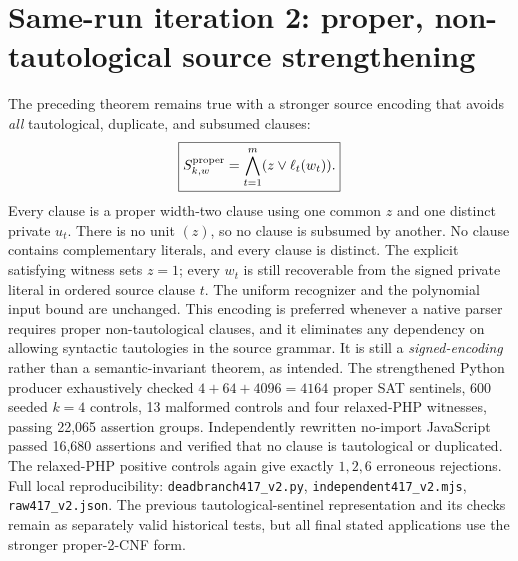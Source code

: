 \documentclass[11pt]{article}
\begin{document}
\section*{Same-run iteration 2: proper, non-tautological source strengthening}
The preceding theorem remains true with a stronger source encoding that avoids \emph{all} tautological, duplicate, and subsumed clauses:
\[
\boxed{S^{\rm proper}_{k,w}=\bigwedge_{t=1}^{m}(z\vee\ell_t(w_t)).}
\]
Every clause is a proper width-two clause using one common \(z\) and one distinct private \(u_t\). There is no unit \((z)\), so no clause is subsumed by another. No clause contains complementary literals, and every clause is distinct. The explicit satisfying witness sets \(z=1\); every \(w_t\) is still recoverable from the signed private literal in ordered source clause \(t\). The uniform recognizer and the polynomial input bound are unchanged. This encoding is preferred whenever a native parser requires proper non-tautological clauses, and it eliminates any dependency on allowing syntactic tautologies in the source grammar. It is still a \emph{signed-encoding} rather than a semantic-invariant theorem, as intended.
The strengthened Python producer exhaustively checked \(4+64+4096=4164\) proper SAT sentinels, 600 seeded \(k=4\) controls, 13 malformed controls and four relaxed-PHP witnesses, passing 22,065 assertion groups. Independently rewritten no-import JavaScript passed 16,680 assertions and verified that no clause is tautological or duplicated. The relaxed-PHP positive controls again give exactly \(1,2,6\) erroneous rejections. Full local reproducibility: \texttt{deadbranch417\_v2.py}, \texttt{independent417\_v2.mjs}, \texttt{raw417\_v2.json}. The previous tautological-sentinel representation and its checks remain as separately valid historical tests, but all final stated applications use the stronger proper-2-CNF form.
\end{document}
